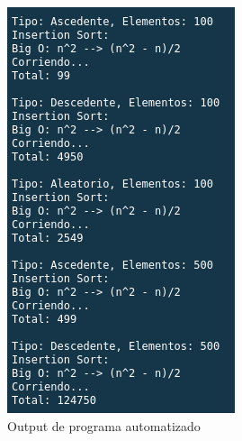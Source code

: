 \documentclass{article}
\begin{document}
\begin{figure}[H]
\begin{multicols}{2}
					\includegraphics[width = \linewidth]{images/e3-4}\par
				\end{multicols}
			\caption{Output de programa automatizado}
			\end{figure}
		
\end{document}
